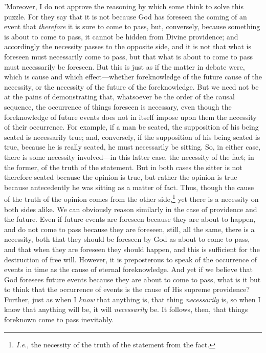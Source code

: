 'Moreover, I do not approve the reasoning by which some think to solve
this puzzle. For they say that it is not because God has foreseen the
coming of an event that \emph{therefore} it is sure to come to pass, but,
conversely, because something is about to come to pass, it cannot be
hidden from Divine providence; and accordingly the necessity passes to
the opposite side, and it is not that what is foreseen must necessarily
come to pass, but that what is about to come to pass must necessarily be
foreseen. But this is just as if the matter in debate were, which is
cause and which effect—whether foreknowledge of the future cause of the
necessity, or the necessity of the future of the foreknowledge. But we
need not be at the pains of demonstrating that, whatsoever be the order
of the causal sequence, the occurrence of things foreseen is necessary,
even though the foreknowledge of future events does not in itself
impose upon them the necessity of their occurrence. For example, if a
man be seated, the supposition of his being seated is necessarily true;
and, conversely, if the supposition of his being seated is true, because
he is really seated, he must necessarily be sitting. So, in either case,
there is some necessity involved—in this latter case, the necessity of
the fact; in the former, of the truth of the statement. But in both
cases the sitter is not therefore seated because the opinion is true,
but rather the opinion is true because antecedently he was sitting as a
matter of fact. Thus, though the cause of the truth of the opinion comes
from the other side,\footnote{\emph{I.e.}, the necessity of the truth of the statement from
the fact.} yet there is a necessity on both sides alike. We
can obviously reason similarly in the case of providence and the future.
Even if future events are foreseen because they are about to happen, and
do not come to pass because they are foreseen, still, all the same,
there is a necessity, both that they should be foreseen by God as about
to come to pass, and that when they are foreseen they should happen, and
this is sufficient for the destruction of free will. However, it is
preposterous to speak of the occurrence of events in time as the cause
of eternal foreknowledge. And yet if we believe that God foresees future
events because they are about to come to pass, what is it but to think
that the occurrence of events is the cause of His supreme providence?
Further, just as when I \emph{know} that anything is, that thing
\emph{necessarily} is, so when I know that anything will be, it will
\emph{necessarily} be. It follows, then, that things foreknown come to pass
inevitably.

